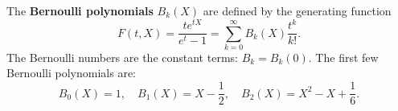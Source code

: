 The \textbf{Bernoulli polynomials} $B_k(X)$ are defined by the generating function
$$F(t, X) = \frac{t e^{tX}}{e^t - 1} = \sum_{k=0}^{\infty} B_k(X) \frac{t^k}{k!}.$$
The Bernoulli numbers are the constant terms: $B_k = B_k(0)$. The first few Bernoulli polynomials are:
$$B_0(X) = 1, \quad B_1(X) = X - \frac{1}{2}, \quad B_2(X) = X^2 - X + \frac{1}{6}.$$
